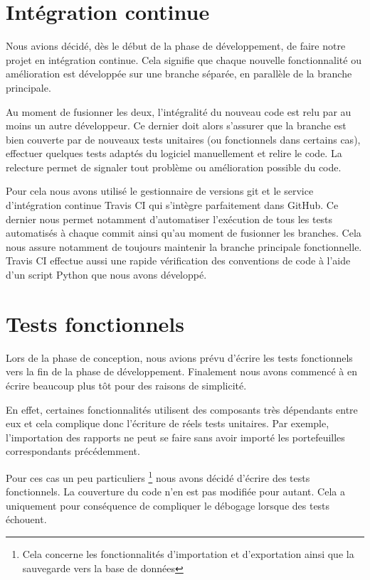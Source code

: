 \documentclass[a4paper,titlepage,french]{report}
\begin{document}
\section{Intégration continue}

Nous avions décidé, dès le début de la phase de développement, de faire notre projet en intégration continue.
Cela signifie que chaque nouvelle fonctionnalité ou amélioration est développée sur une branche séparée, en parallèle de la branche principale.

Au moment de fusionner les deux, l'intégralité du nouveau code est relu par au moins un autre développeur.
Ce dernier doit alors s'assurer que la branche est bien couverte par de nouveaux tests unitaires (ou fonctionnels dans certains cas), effectuer quelques tests adaptés du logiciel manuellement et relire le code.
La relecture permet de signaler tout problème ou amélioration possible du code.

Pour cela nous avons utilisé le gestionnaire de versions git et le service d'intégration continue Travis CI qui s'intègre parfaitement dans GitHub.
Ce dernier nous permet notamment d'automatiser l'exécution de tous les tests automatisés à chaque commit ainsi qu'au moment de fusionner les branches.
Cela nous assure notamment de toujours maintenir la branche principale fonctionnelle.
Travis CI effectue aussi une rapide vérification des conventions de code à l'aide d'un script Python que nous avons développé.


\section{Tests fonctionnels}

Lors de la phase de conception, nous avions prévu d'écrire les tests fonctionnels vers la fin de la phase de développement.
Finalement nous avons commencé à en écrire beaucoup plus tôt pour des raisons de simplicité.

En effet, certaines fonctionnalités utilisent des composants très dépendants entre eux et cela complique donc l'écriture de réels tests unitaires.
Par exemple, l'importation des rapports ne peut se faire sans avoir importé les portefeuilles correspondants précédemment.

Pour ces cas un peu particuliers \footnote{Cela concerne les fonctionnalités d'importation et d'exportation ainsi que la sauvegarde vers la base de données} nous avons décidé d'écrire des tests fonctionnels.
La couverture du code n'en est pas modifiée pour autant.
Cela a uniquement pour conséquence de compliquer le débogage lorsque des tests échouent.
\end{document}
